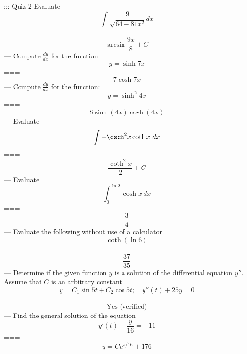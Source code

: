 ::: Quiz 2
Evaluate
\[\int\frac{9}{\sqrt{64-81x^2}}dx\]
===
\[\arcsin\frac{9x}{8}+C\]
---
Compute \(\frac{dy}{dx}\) for the function
\[y=\sinh 7x\]
===
\[7\cosh 7x\]
---
Compute \(\frac{dy}{dx}\) for the function:
\[y=\sinh^2 4x\]
===
\[8\sinh(4x)\cosh(4x)\]
---
Evaluate
\[\int-\csch^2 x\coth x\ dx\]
===
\[\frac{\coth^2 x}{2}+C\]
---
Evaluate
\[\int_0^{\ln 2}\cosh x\ dx\]
===
\[\frac{3}{4}\]
---
Evaluate the following without use of a calculator
\[\coth(\ln 6)\]
===
\[\frac{37}{35}\]
---
Determine if the given function \(y\) is a solution of the differential equation \(y''\). Assume that \(C\) is an arbitrary constant.
\[y=C_1\sin 5t+C_2\cos 5t;\quad y''(t)+25y=0\]
===
\[\text{Yes (verified)}\]
---
Find the general solution of the equation
\[y'(t)-\frac{y}{16}=-11\]
===
\[y=Ce^{x/16}+176\]
